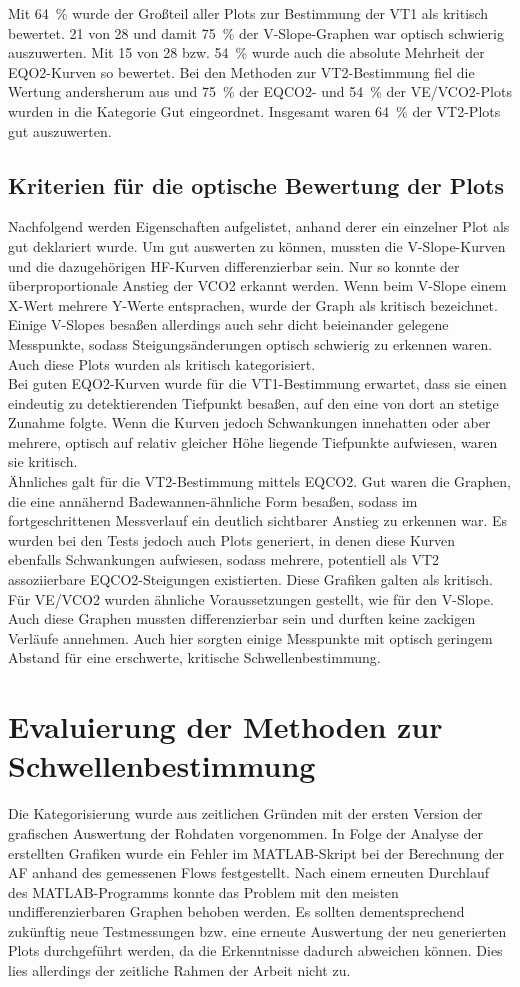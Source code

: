 %
Mit 64~\% wurde der Großteil aller Plots zur Bestimmung der VT1 als kritisch bewertet. 21 von 28 und damit 75~\% der V-Slope-Graphen war optisch schwierig auszuwerten. Mit 15 von 28 bzw. 54~\% wurde auch die absolute Mehrheit der \gls{EQO2}-Kurven so bewertet. Bei den Methoden zur VT2-Bestimmung fiel die Wertung andersherum aus und 75~\% der \gls{EQCO2}- und 54~\% der \gls{VE}/\gls{VCO2}-Plots wurden in die Kategorie Gut eingeordnet. Insgesamt waren 64~\% der VT2-Plots gut auszuwerten.
%
\subsection{Kriterien für die optische Bewertung der Plots}
%
Nachfolgend werden Eigenschaften aufgelistet, anhand derer ein einzelner Plot als gut deklariert wurde. Um gut auswerten zu können, mussten die V-Slope-Kurven und die dazugehörigen \gls{HF}-Kurven differenzierbar sein. Nur so konnte der überproportionale Anstieg der \gls{VCO2} erkannt werden. Wenn beim V-Slope einem X-Wert mehrere Y-Werte entsprachen, wurde der Graph als kritisch bezeichnet. Einige V-Slopes besaßen allerdings auch sehr dicht beieinander gelegene Messpunkte, sodass Steigungsänderungen optisch schwierig zu erkennen waren. Auch diese Plots wurden als kritisch kategorisiert.\\
Bei guten \gls{EQO2}-Kurven wurde für die VT1-Bestimmung erwartet, dass sie einen eindeutig zu detektierenden Tiefpunkt besaßen, auf den eine von dort an stetige Zunahme folgte. Wenn die Kurven jedoch Schwankungen innehatten oder aber mehrere, optisch auf relativ gleicher Höhe liegende Tiefpunkte aufwiesen, waren sie kritisch.\\
Ähnliches galt für die VT2-Bestimmung mittels \gls{EQCO2}. Gut waren die Graphen, die eine annähernd Badewannen-ähnliche Form besaßen, sodass im fortgeschrittenen Messverlauf ein deutlich sichtbarer Anstieg zu erkennen war. Es wurden bei den Tests jedoch auch Plots generiert, in denen diese Kurven ebenfalls Schwankungen aufwiesen, sodass mehrere, potentiell als VT2 assoziierbare \gls{EQCO2}-Steigungen existierten. Diese Grafiken galten als kritisch.\\
Für \gls{VE}/\gls{VCO2} wurden ähnliche Voraussetzungen gestellt, wie für den V-Slope. Auch diese Graphen mussten differenzierbar sein und durften keine zackigen Verläufe annehmen. Auch hier sorgten einige Messpunkte mit optisch geringem Abstand für eine erschwerte, kritische Schwellenbestimmung. 
%
\section{Evaluierung der Methoden zur Schwellenbestimmung}
%
Die Kategorisierung wurde aus zeitlichen Gründen mit der ersten Version der grafischen Auswertung der Rohdaten vorgenommen. In Folge der Analyse der erstellten Grafiken wurde ein Fehler im MATLAB-Skript bei der Berechnung der \gls{AF} anhand des gemessenen Flows festgestellt. Nach einem erneuten Durchlauf des MATLAB-Programms konnte das Problem mit den meisten undifferenzierbaren Graphen behoben werden. Es sollten dementsprechend zukünftig neue Testmessungen bzw. eine erneute Auswertung der neu generierten Plots durchgeführt werden, da die Erkenntnisse dadurch abweichen können. Dies lies allerdings der zeitliche Rahmen der Arbeit nicht zu.
%
